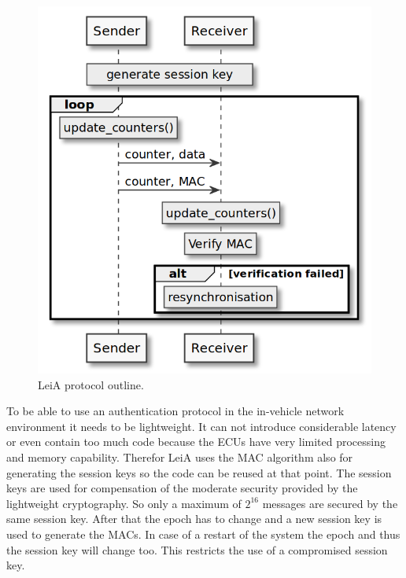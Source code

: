 \begin{figure}[h]
    \centering
    \captionsetup{justification=centering}
	\includegraphics[width=0.9\linewidth]{Figures/LeiA_outline.png}
	\caption[]{LeiA protocol outline.}
	\label{fig:leia_outline}
\end{figure}

To be able to use an authentication protocol in the in-vehicle network
environment it needs to be lightweight. It can not introduce considerable
latency or even contain too much code because the ECUs have very limited
processing and memory capability. Therefor LeiA uses the MAC algorithm also for
generating the session keys so the code can be reused at that point. The session
keys are used for compensation of the moderate security provided by the
lightweight cryptography. So only a maximum of \( 2^16 \) messages are secured
by the same session key. After that the epoch has to change and a new session
key is used to generate the MACs. In case of a restart of the system the epoch
and thus the session key will change too. This restricts the use of a
compromised session key.

